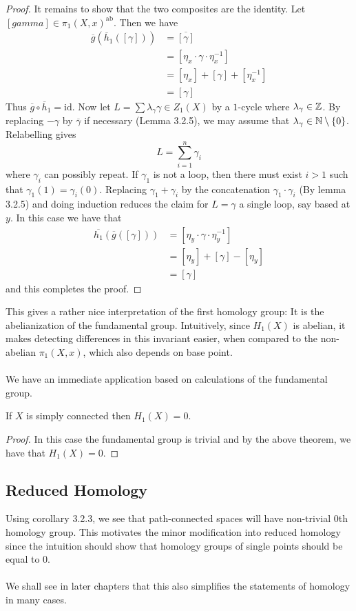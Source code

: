 \documentclass[a4paper]{article}
\begin{document}
\begin{thm}{}{}
\begin{proof}
It remains to show that the two composites are the identity. Let $[gamma]\in\pi_1(X,x)^\text{ab}$. Then we have 
\begin{align*}
\overline{g}(\overline{h}_1([\gamma]))&=\overline{[\gamma]}\\
&=[\eta_x\cdot\gamma\cdot\eta_x^{-1}]\\
&=[\eta_x]+[\gamma]+[\eta_x^{-1}]\\
&=[\gamma]
\end{align*}
Thus $\overline{g}\circ\overline{h}_1=\text{id}$. Now let $L=\sum\lambda_\gamma\gamma\in Z_1(X)$ by a $1$-cycle where $\lambda_\gamma\in\mathbb{Z}$. By replacing $-\gamma$ by $\overline{\gamma}$ if necessary (Lemma 3.2.5), we may assume that $\lambda_\gamma\in\mathbb{N}\setminus\{0\}$. Relabelling gives $$L=\sum_{i=1}^n\gamma_i$$ where $\gamma_i$ can possibly repeat. If $\gamma_1$ is not a loop, then there must exist $i>1$ such that $\gamma_1(1)=\gamma_i(0)$. Replacing $\gamma_1+\gamma_i$ by the concatenation $\gamma_1\cdot\gamma_i$ (By lemma 3.2.5) and doing induction reduces the claim for $L=\gamma$ a single loop, say based at $y$. In this case we have that 
\begin{align*}
\overline{h_1}(\overline{g}([\gamma]))&=[\eta_y\cdot\gamma\cdot\eta_y^{-1}]\\
&=[\eta_y]+[\gamma]-[\eta_y]\\
&=[\gamma]
\end{align*}
and this completes the proof. 
\end{proof}
\end{thm}

This gives a rather nice interpretation of the first homology group: It is the abelianization of the fundamental group. Intuitively, since $H_1(X)$ is abelian, it makes detecting differences in this invariant easier, when compared to the non-abelian $\pi_1(X,x)$, which also depends on base point. \\~\\

We have an immediate application based on calculations of the fundamental group. 

\begin{crl}{}{} If $X$ is simply connected then $H_1(X)=0$. \tcbline
\begin{proof}
In this case the fundamental group is trivial and by the above theorem, we have that $H_1(X)=0$. 
\end{proof}
\end{crl}

\subsection{Reduced Homology}
Using corollary 3.2.3, we see that path-connected spaces will have non-trivial $0$th homology group. This motivates the minor modification into reduced homology since the intuition should show that homology groups of single points should be equal to $0$. \\~\\
We shall see in later chapters that this also simplifies the statements of homology in many cases. 
\end{document}
